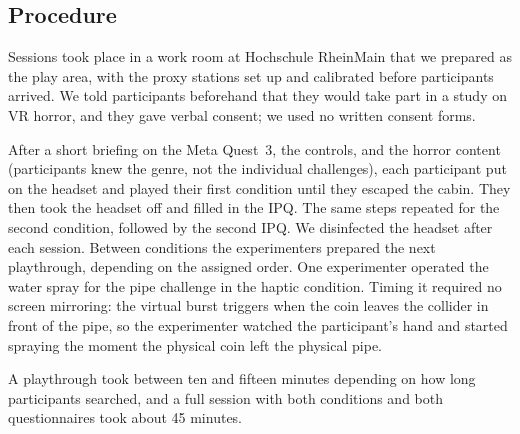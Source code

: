 
\subsection{Procedure}
\label{sec:study-procedure}

Sessions took place in a work room at Hochschule RheinMain that we prepared as the play area, with the proxy stations set up and calibrated before participants arrived. We told participants beforehand that they would take part in a study on VR horror, and they gave verbal consent; we used no written consent forms.

After a short briefing on the Meta Quest~3, the controls, and the horror content (participants knew the genre, not the individual challenges), each participant put on the headset and played their first condition until they escaped the cabin. They then took the headset off and filled in the IPQ. The same steps repeated for the second condition, followed by the second IPQ. We disinfected the headset after each session. Between conditions the experimenters prepared the next playthrough, depending on the assigned order. One experimenter operated the water spray for the pipe challenge in the haptic condition. Timing it required no screen mirroring: the virtual burst triggers when the coin leaves the collider in front of the pipe, so the experimenter watched the participant's hand and started spraying the moment the physical coin left the physical pipe.

A playthrough took between ten and fifteen minutes depending on how long participants searched, and a full session with both conditions and both questionnaires took about 45 minutes.
